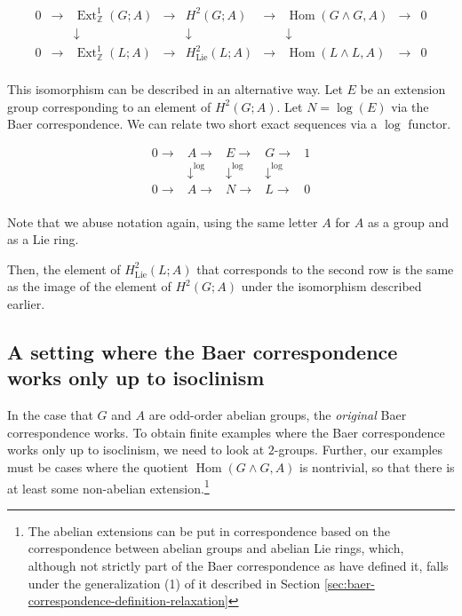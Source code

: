 \documentclass{ucetd}
\begin{document}
$$\begin{array}{ccccccccc}
  0 &\to &\operatorname{Ext}^1_{\mathbb{Z}}(G;A) &\to &H^2(G;A) &\to &\operatorname{Hom}(G \wedge G,A) &\to &0\\
  & & \downarrow & & \downarrow & & \downarrow & & \\
  0 &\to &\operatorname{Ext}^1_{\mathbb{Z}}(L;A) & \to & H^2_{\text{Lie}}(L;A) & \to & \operatorname{Hom}(L \wedge L, A) & \to & 0\\
\end{array}$$

This isomorphism can be described in an alternative way. Let $E$ be an
extension group corresponding to an element of $H^2(G;A)$. Let $N =
\log(E)$ via the Baer correspondence. We can relate two short exact
sequences via a $\log$ functor.

$$\begin{array}{lllll}
    0 \to & A \to & E \to & G \to & 1 \\
    & \downarrow^{\log} & \downarrow^{\log} & \downarrow^{\log}&  \\
    0  \to & A \to & N \to & L \to & 0\\
\end{array}$$

Note that we abuse notation again, using the same letter $A$ for $A$
as a group and as a Lie ring.

Then, the element of $H^2_{\text{Lie}}(L;A)$ that corresponds to the
second row is the same as the image of the element of $H^2(G;A)$ under
the isomorphism described earlier.

\subsection{A setting where the Baer correspondence works only up to isoclinism}\label{sec:bcuti-ex}

In the case that $G$ and $A$ are odd-order abelian groups, the {\em
  original} Baer correspondence works. To obtain finite examples where
the Baer correspondence works only up to isoclinism, we need to look
at $2$-groups. Further, our examples must be cases where the quotient
$\operatorname{Hom}(G \wedge G,A)$ is nontrivial, so that there is at
least some non-abelian extension.\footnote{The abelian extensions can
  be put in correspondence based on the correspondence between abelian
  groups and abelian Lie rings, which, although not strictly part of
  the Baer correspondence as have defined it, falls under the
  generalization (1) of it described in Section
  \ref{sec:baer-correspondence-definition-relaxation}}
\end{document}
